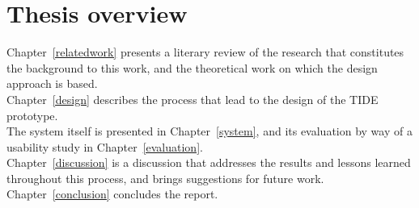 \section{Thesis overview}

Chapter~\ref{relatedwork} presents a literary review of the research that constitutes the background to this work, and the theoretical work on which the design approach is based.\\
Chapter~\ref{design} describes the process that lead to the design of the TIDE prototype.\\
The system itself is presented in Chapter~\ref{system}, and its evaluation by way of a usability study in Chapter~\ref{evaluation}.\\
Chapter~\ref{discussion} is a discussion that addresses the results and lessons learned throughout this process, and brings suggestions for future work.\\
Chapter~\ref{conclusion} concludes the report.



